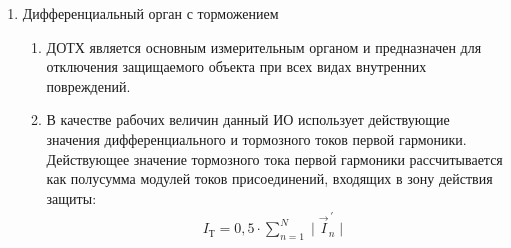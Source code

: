 \begin{enumerate}[label=\arabic{section}.\arabic{subsection}.\arabic{enumi}, labelsep=4pt, leftmargin=0pt, itemindent=57pt, itemsep=0pt, parsep=5pt]
\begin{enumerate}[label=\arabic{section}.\arabic{subsection}.\arabic{enumi}.\arabic*, labelsep=4pt, leftmargin=0em, itemindent=65pt, parsep=0pt]
\item
Данный ИО выполнен без торможения и может быть заблокирован только при обнаружении неисправности в ЦТ.
В качестве рабочей величины использует действующее значение первой гармоники дифференциального тока, которое определяется как модуль геометрической суммы первых гармоник токов присоединений, входящих в зону действия защиты:
\begin{align}
I_\textit{Д}=\mid \sum_{n=1}^N \vec{I}_{n}^{\,'} \mid
\end{align}

\item
Ток срабатывания ДТО для каждого дифференциального органа задается уставкой \textbf{«Iдто ПО»} (\textbf{«Iдто ИО1», «Iдто ИО2»}).


\end{enumerate}


\item Дифференциальный орган с торможением

\begin{enumerate}[label=\arabic{section}.\arabic{subsection}.\arabic{enumi}.\arabic*, labelsep=4pt, leftmargin=0em, itemindent=65pt, parsep=0pt]

\item
ДОТХ является основным измерительным органом и предназначен для отключения защищаемого объекта при всех видах внутренних повреждений.

\item
В качестве рабочих величин данный ИО использует действующие значения дифференциального и тормозного токов первой гармоники.
Действующее значение тормозного тока первой гармоники рассчитывается как полусумма модулей токов присоединений, входящих в зону действия защиты:
\begin{align}
I_\textit{Т}=0,5 \cdot \sum_{n=1}^N \mid \vec{I}_{n}^{\,'} \mid
\end{align}


\end{enumerate}
\end{enumerate}
